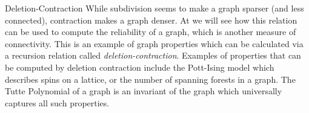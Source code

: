 \begin{projectdescription}{Deletion-Contraction}
	While subdivision seems to make a graph sparser (and less connected), contraction makes a graph denser. 
	At  we will see how this relation can be used to compute the reliability of a graph, which is another measure of connectivity. 
	This is an example of graph properties which can be calculated via a recursion relation called \emph{deletion-contraction}.
	Examples of properties that can be computed by deletion contraction include the Pott-Ising model which describes spins on a lattice, or the number of spanning forests in a graph. 
	The Tutte Polynomial of a graph is an invariant of the graph which universally captures all such properties. 
\label{proj:polynomials}
\end{projectdescription}

